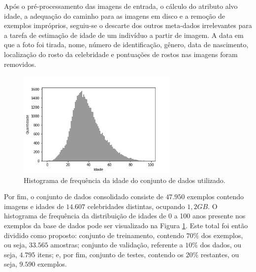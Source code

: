 Após o pré-processamento das imagens de entrada, o cálculo do atributo alvo idade, a adequação do caminho para as imagens em disco e a remoção de exemplos impróprios, seguiu-se o descarte dos outros meta-dados irrelevantes para a tarefa de estimação de idade de um indivíduo a partir de imagem. A data em que a foto foi tirada, nome, número de identificação, gênero, data de nascimento, localização do rosto da celebridade e pontuações de rostos nas imagens foram removidos.

\begin{figure}[!ht]
    \centering
     \includegraphics[width=0.7\textwidth]{img/idade_hist_clean}
     \caption{Histograma de frequência da idade do conjunto de dados utilizado.}
     \label{fig:hist}
\end{figure}

Por fim, o conjunto de dados consolidado consiste de $47.950$ exemplos contendo imagens e idades de $14.607$ celebridades distintas, ocupando $1,2 GB$. O histograma de frequência da distribuição de idades de 0 a 100 anos presente nos exemplos da base de dados pode ser visualizado na Figura \ref{fig:hist}. Este total foi então dividido como proposto: conjunto de treinamento, contendo $70\%$ dos exemplos, ou seja, $33.565$ amostras; conjunto de validação, referente a $10\%$ dos dados, ou seja, $4.795$ itens; e, por fim, conjunto de testes, contendo os $20\%$ restantes, ou seja, $9.590$ exemplos.
